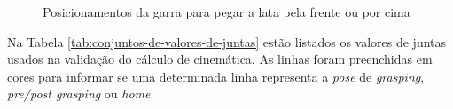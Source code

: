 \begin{figure}[h!]
	\centering
	\caption{Posicionamentos da garra para pegar a lata pela frente ou por cima}
	\label{fig:posicionamentos-da-garra-sup-inf}
	\hspace{1cm}%
\end{figure}

\FloatBarrier

Na Tabela \ref{tab:conjuntos-de-valores-de-juntas} estão listados os valores de juntas usados na validação do cálculo de cinemática.
As linhas foram preenchidas em cores para informar se uma determinada linha representa a \textit{pose}
de \textit{grasping}, \textit{pre/post grasping} ou \textit{home}.

